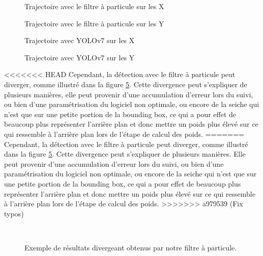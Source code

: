 \begin{figure}[!htbp]
\center
\caption{Trajectoire avec le filtre à particule sur les X}
\label{fig:trajX_pf}
\end{figure}
\FloatBarrier

\begin{figure}[!htbp]
\center
\caption{Trajectoire avec le filtre à particule sur les Y}
\label{fig:trajY_pf}
\end{figure}
\FloatBarrier

\begin{figure}[!htbp]
\center
\caption{Trajectoire avec YOLOv7 sur les X}
\label{fig:trajX_yolo}
\end{figure}
\FloatBarrier

\begin{figure}[!htbp]
\center
\caption{Trajectoire avec YOLOv7 sur les Y}
\label{fig:trajY_yolo}
\end{figure}
\FloatBarrier
 
<<<<<<< HEAD
Cependant, la détection avec le filtre à particule peut diverger, comme illustré dans la figure \ref{fig:pf_diverg_results}. Cette divergence peut s'expliquer de plusieurs manières, elle peut provenir d'une accumulation d'erreur lors du suivi, ou bien d'une paramétrisation du logiciel non optimale, ou encore de la seiche qui n'est que sur une petite portion de la bounding box, ce qui a pour effet de beaucoup plus représenter l'arrière plan et donc mettre un poids plus élevé sur ce qui ressemble à l'arrière plan lors de l'étape de calcul des poids.
=======
Cependant, la détection avec le filtre à particule peut diverger, comme illustré dans la figure \ref{fig:pf_diverg_results}. Cette divergence peut s'expliquer de plusieurs manières. Elle peut provenir d'une accumulation d'erreur lors du suivi, ou bien d'une paramétrisation du logiciel non optimale, ou encore de la seiche qui n'est que sur une petite portion de la bounding box, ce qui a pour effet de beaucoup plus représenter l'arrière plan et donc mettre un poids plus élevé sur ce qui ressemble à l'arrière plan lors de l'étape de calcul des poids.
>>>>>>> a979539 (Fix typos)

\begin{figure}[!htbp]
\center
	\hspace{0.1cm}
	\\
	\hspace{0.1cm}
\caption{Exemple de résultats divergeant obtenus par notre filtre à particule.}
\label{fig:pf_diverg_results}
\end{figure}
\FloatBarrier

\clearpage